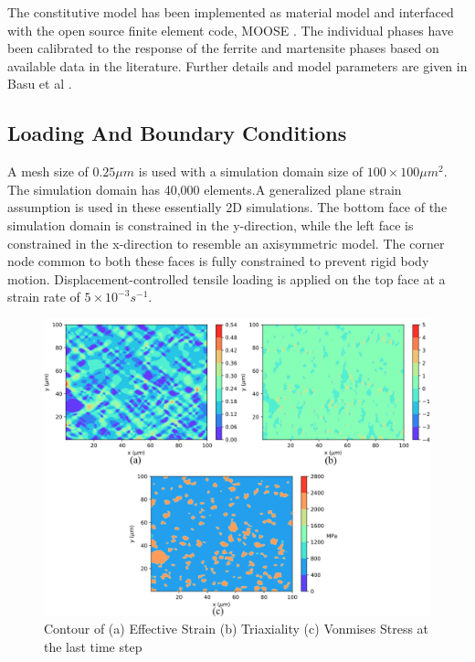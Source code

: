 The constitutive model has been implemented as material model and interfaced with the open source finite element code, MOOSE \cite{permann2020moose}. The individual phases have been calibrated to the response of the ferrite and martensite phases based on available data in the literature. Further details and model parameters are given in Basu et al \cite{soudip}.

\subsection{Loading And Boundary Conditions}
A mesh size of $0.25 \mu m$ is used with a simulation domain size of $100\times100 \mu m^2$. The simulation domain has 40,000 elements.A generalized plane strain assumption is used in these essentially 2D simulations. The bottom face of the simulation domain is constrained in the y-direction, while the left face is constrained in the x-direction to resemble an axisymmetric model. The corner node common to both these faces is fully constrained to prevent rigid body motion. Displacement-controlled tensile loading is applied on the top face at a strain rate of $5\times10^{-3}s^{-1}$.
\begin{figure}[!h]
	\centering
	\includegraphics[width=\textwidth]{Pictures/result-fe.png}
	\hspace{1mm}
	\caption{Contour of (a) Effective Strain (b) Triaxiality (c) Vonmises Stress at the last time step} 
	\label{fig:exo-plots}
\end{figure}
